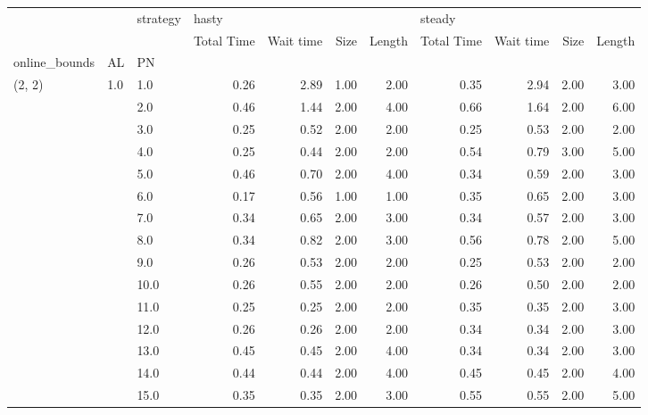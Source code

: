 \begin{tabular}{lllrrrrrrrr}
\toprule
       &     & strategy & \multicolumn{4}{l}{hasty} & \multicolumn{4}{l}{steady} \\
       &     & {} & Total Time & Wait time & Size & Length & Total Time & Wait time & Size & Length \\
online\_bounds & AL & PN &            &           &      &        &            &           &      &        \\
\midrule
(2, 2) & 1.0 & 1.0  &       0.26 &      2.89 & 1.00 &   2.00 &       0.35 &      2.94 & 2.00 &   3.00 \\
       &     & 2.0  &       0.46 &      1.44 & 2.00 &   4.00 &       0.66 &      1.64 & 2.00 &   6.00 \\
       &     & 3.0  &       0.25 &      0.52 & 2.00 &   2.00 &       0.25 &      0.53 & 2.00 &   2.00 \\
       &     & 4.0  &       0.25 &      0.44 & 2.00 &   2.00 &       0.54 &      0.79 & 3.00 &   5.00 \\
       &     & 5.0  &       0.46 &      0.70 & 2.00 &   4.00 &       0.34 &      0.59 & 2.00 &   3.00 \\
       &     & 6.0  &       0.17 &      0.56 & 1.00 &   1.00 &       0.35 &      0.65 & 2.00 &   3.00 \\
       &     & 7.0  &       0.34 &      0.65 & 2.00 &   3.00 &       0.34 &      0.57 & 2.00 &   3.00 \\
       &     & 8.0  &       0.34 &      0.82 & 2.00 &   3.00 &       0.56 &      0.78 & 2.00 &   5.00 \\
       &     & 9.0  &       0.26 &      0.53 & 2.00 &   2.00 &       0.25 &      0.53 & 2.00 &   2.00 \\
       &     & 10.0 &       0.26 &      0.55 & 2.00 &   2.00 &       0.26 &      0.50 & 2.00 &   2.00 \\
       &     & 11.0 &       0.25 &      0.25 & 2.00 &   2.00 &       0.35 &      0.35 & 2.00 &   3.00 \\
       &     & 12.0 &       0.26 &      0.26 & 2.00 &   2.00 &       0.34 &      0.34 & 2.00 &   3.00 \\
       &     & 13.0 &       0.45 &      0.45 & 2.00 &   4.00 &       0.34 &      0.34 & 2.00 &   3.00 \\
       &     & 14.0 &       0.44 &      0.44 & 2.00 &   4.00 &       0.45 &      0.45 & 2.00 &   4.00 \\
       &     & 15.0 &       0.35 &      0.35 & 2.00 &   3.00 &       0.55 &      0.55 & 2.00 &   5.00 \\

\end{tabular}
